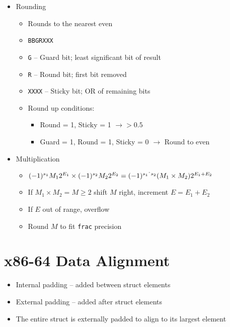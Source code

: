 \documentclass[twocolumn]{article}
\renewcommand{\tt}[1]{\texttt{#1}}
\begin{document}
\begin{itemize}[noitemsep]
\begin{itemize}[noitemsep]
    \end{itemize}
    \item Rounding
    \begin{itemize}[noitemsep]
        \item Rounds to the nearest even
        \item \tt{BBGRXXX}
        \item \tt{G} -- Guard bit; least significant bit of result
        \item \tt{R} -- Round bit; first bit removed
        \item \tt{XXXX} -- Sticky bit; OR of remaining bits
        \item Round up conditions:
        \begin{itemize}[noitemsep]
            \item Round = 1, Sticky = 1 $\to > 0.5$
            \item Guard = 1, Round = 1, Sticky = 0 $\to$ Round to even
        \end{itemize}
    \end{itemize}
    \item Multiplication
    \begin{itemize}[noitemsep]
        \item $(-1)^{s_1}M_12^{E_1} \times (-1)^{s_2}M_22^{E_2} = (-1)^{s_1 \string^ s_2}(M_1 \times M_2)2^{E_1 + E_2}$
        \item If $M_1 \times M_2 = M \geq 2$ shift $M$ right, increment $E = E_1 + E_2$
        \item If $E$ out of range, overflow
        \item Round $M$ to fit \tt{frac} precision
    \end{itemize}
\end{itemize}

\vfill
\pagebreak

\section{x86-64 Data Alignment}
\begin{itemize}[noitemsep]
    \item Internal padding -- added between struct elements
    \item External padding -- added after struct elements
    \item The entire struct is externally padded to align to its largest element
\end{itemize}
\end{document}
